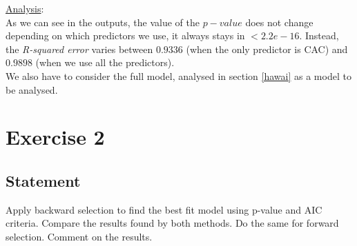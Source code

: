 \documentclass[a4paper, 11pt]{article}
\begin{document}
\vspace{1em}
\hspace{-1.5em}\underline{Analysis}:\\
As we can see in the outputs, the value of the $p-value$ does not change depending on which predictors we use, it always stays in $< 2.2e-16$. Instead, the \textit{R-squared error} varies between $0.9336$ (when the only predictor is CAC) and $0.9898$ (when we use all the predictors).\\
We also have to consider the full model, analysed in section \textcolor{blue}{\ref{hawai}} as a model to be analysed.
\newpage
\section{Exercise 2}
\subsection{Statement}
Apply backward selection to find the best fit model using p-value and AIC
criteria. Compare the results found by both methods. Do the same for
forward selection. Comment on the results.
\end{document}
